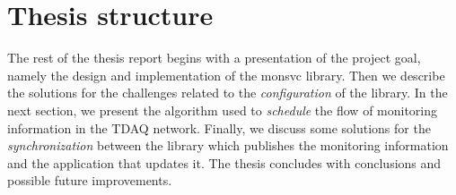 \section*{Thesis structure}

The rest of the thesis report begins with a presentation of the project goal, namely the design and implementation of the  monsvc library. Then we describe the solutions for the challenges related to the \emph{configuration} of the library. In the next section, we present the algorithm used to \emph{schedule} the flow of monitoring information in the TDAQ network. Finally, we discuss some solutions for the \emph{synchronization} between the library which publishes the monitoring information and the application that updates it. The thesis concludes with conclusions and possible future improvements.

